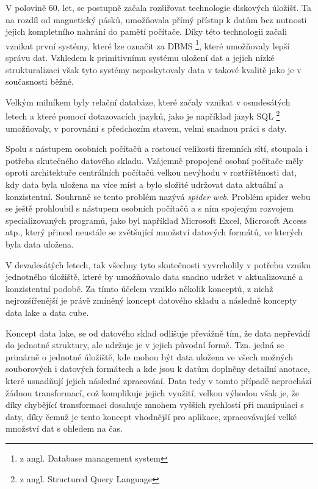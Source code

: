 \documentclass[
  digital,     %
  twoside,     %
  lof,         %
  lot,         %
]{fithesis4}
\begin{document}
V polovině 60. let, se postupně začala rozšiřovat technologie diskových úložišť. Ta na rozdíl od magnetický pásků, umožňovala přímý přístup k datům bez nutnosti jejich kompletního nahrání do pamětí počítače. Díky této technologii začali vznikat první systémy, které lze označit za DBMS \footnote{z angl. Database management system}, které umožňovaly lepší správu dat.\parencite{Foote19042018} Vzhledem k primitivnímu systému uložení dat a jejich nízké strukturalizaci však tyto systémy neposkytovaly data v takové kvalitě jako je v současnosti běžné.

Velkým milníkem byly relační databáze, které začaly vznikat v osmdesátých letech a které pomocí dotazovacích jazyků, jako je například jazyk SQL \footnote{z angl. Structured Query Language} umožňovaly, v porovnání s předchozím stavem, velmi snadnou práci s daty.\parencite{Foote19042018}

Spolu s nástupem osobních počítačů a rostoucí velikostí firemních sítí, stoupala i potřeba skutečného datového skladu. Vzájemně propojené osobní počítače měly oproti architektuře centrálních počítačů velkou nevýhodu v roztříštěnosti dat, kdy data byla uložena na více míst a bylo složité udržovat data aktuální a konzistentní. Souhrnně se tento problém nazývá \emph{spider web}. \parencite[s.~6]{Inmon2005} Problém spider webu se ještě prohloubil s nástupem osobních počítačů a s ním spojeným rozvojem specializovaných programů, jako byl například Microsoft Excel, Microsoft Access atp., který přinesl neustále se zvětšující množství datových formátů, ve kterých byla data uložena.\parencite{Foote19042018}

V devadesátých letech, tak všechny tyto skutečnosti vyvrcholily v potřebu vzniku jednotného úložiště, které by umožňovalo data snadno udržet v aktualizované a konzistentní podobě. Za tímto účelem vzniklo několik konceptů, z nichž nejrozšířenější je právě zmíněný koncept datového skladu a následně koncepty data lake a data cube.

Koncept data lake, se od datového sklad odlišuje převážně tím, že data nepřevádí do jednotné struktury, ale udržuje je v jejich původní formě. Tzn. jedná se primárně o jednotné úložiště, kde mohou být data uložena ve všech možných souborových i datových formátech a kde jsou k datům doplněny detailní anotace, které usnadňují jejich následné zpracování.\parencite{Foote19042018} Data tedy v tomto případě neprochází žádnou transformací, což komplikuje jejich využití, velkou výhodou však je, že  díky chybějící  transformaci dosahuje mnohem vyšších rychlostí při manipulaci s daty, díky čemuž je tento koncept vhodnější pro aplikace, zpracovávající velké množství dat s ohledem na čas.\parencite[s.~1]{Harby20221217}
\end{document}
